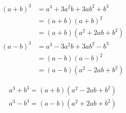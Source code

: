 \begin{theorem}
    \label{co:formula-cube-sd}
    \begin{align*}
        (a + b)^3 &= a^3 + 3a^2 b + 3a b^2 + b^3 \\
                  &= ( a+b ) ( a+b )^2 \\
                  &= ( a+b ) (a^2 + 2ab + b^2) \\
        (a - b)^3 &= a^3 - 3a^2 b + 3a b^2 - b^3 \\
                  &= ( a-b ) ( a-b )^2 \\
                  &= ( a-b ) (a^2 - 2ab + b^2)
    \end{align*}
\end{theorem}

\begin{corollary}
    \label{co:formula-sd-cube}
    \begin{align*}
        a^3 + b^3 = (a + b)(a^2 - 2ab + b^2) \\
        a^3 - b^3 = (a - b)(a^2 + 2ab + b^2)
    \end{align*}
\end{corollary}
